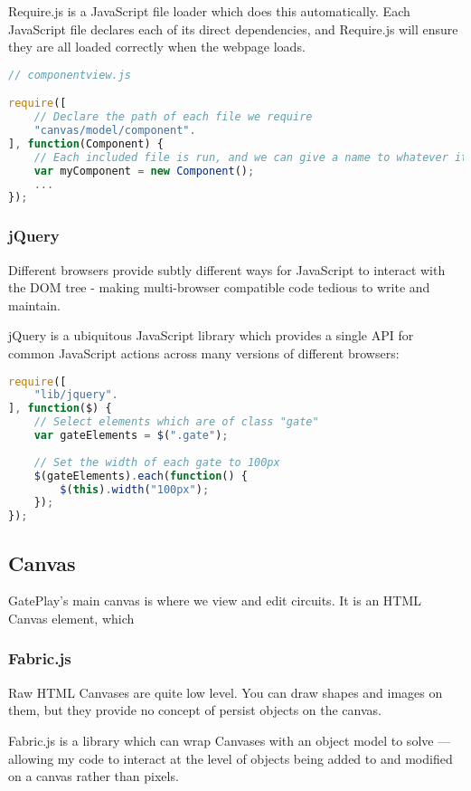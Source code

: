 Require.js is a JavaScript file loader which does this automatically. Each JavaScript file declares each of its direct dependencies, and Require.js will ensure they are all loaded correctly when the webpage loads.

\begin{lstlisting}[language=JavaScript]
// componentview.js

require([
	// Declare the path of each file we require	
	"canvas/model/component".
], function(Component) {
	// Each included file is run, and we can give a name to whatever it returns if desired
	var myComponent = new Component();
	...
});
\end{lstlisting}

\subsubsection{jQuery}
Different browsers provide subtly different ways for JavaScript to interact with the DOM tree - making multi-browser compatible code tedious to write and maintain.

jQuery is a ubiquitous JavaScript library which provides a single API for common JavaScript actions across many versions of different browsers:

\begin{lstlisting}[language=JavaScript]
require([
	"lib/jquery".
], function($) {
	// Select elements which are of class "gate"
	var gateElements = $(".gate");
	
	// Set the width of each gate to 100px
	$(gateElements).each(function() {
		$(this).width("100px");
	});
});
\end{lstlisting}

\subsection{Canvas}
GatePlay's main canvas is where we view and edit circuits. It is an HTML Canvas element, which


\subsubsection{Fabric.js}
Raw HTML Canvases are quite low level. You can draw shapes and images on them, but they provide no concept of persist objects on the canvas.

Fabric.js is a library which can wrap Canvases with an object model to solve --- allowing my code to interact at the level of objects being added to and modified on a canvas rather than pixels. 

